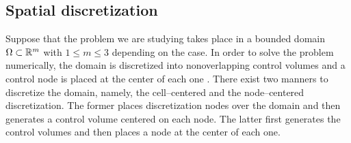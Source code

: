 
\subsection{Spatial discretization}

Suppose that the problem we are studying takes place in a bounded domain $\Omega \subset \mathbb{R}^m$ with $1 \leq m \leq 3$ depending on the case. In order to solve the problem numerically, the domain is discretized into nonoverlapping control volumes and a control node is placed at the center of each one \cite{patankar2018numerical}. There exist two manners to discretize the domain, namely, the cell--centered and the node--centered discretization. The former places discretization nodes over the domain and then generates a control volume centered on each node. The latter first generates the control volumes and then places a node at the center of each one.
